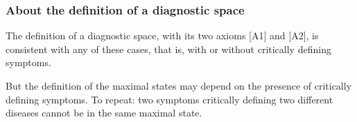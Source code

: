 \documentclass{beamer}
\def\wl{\vskip 4mm}
\def\itbul{\item[$\bullet$]}
\begin{document}
  \begin{frame}
  \frametitle{About the definition of a diagnostic space}
  \wl
  \begin{roster}
 \itbul \rm The definition of a diagnostic space, with its two axioms [A1] and [A2], is consistent with any of these cases, that is, with or without critically defining symptoms.
  \wl
  \itbul But the definition of the maximal states may depend on the presence of critically defining symptoms. To repeat: two symptoms critically defining two different diseases cannot be in the same maximal state.
  \end{roster}
  \vspace{.5cm}


  \end{frame}
 
\end{document}
